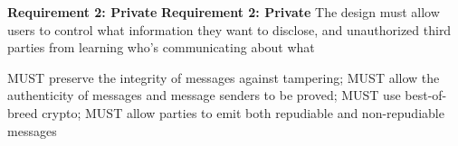 \textbf{Requirement 2: Private}
\textbf{Requirement 2: Private}
The design must allow users to control what information they want to disclose, and unauthorized third parties from learning who’s communicating about what

MUST preserve the integrity of messages against tampering; MUST allow the authenticity of messages and message senders to be proved; MUST use best-of-breed crypto; MUST allow parties to emit both repudiable and non-repudiable messages


